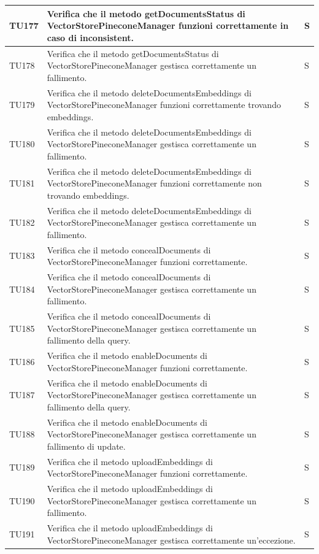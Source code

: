 \documentclass[10pt, a4paper]{article}
\begin{document}
\begin{xltabular}{\textwidth}{p{0.12\textwidth}|p{0.7\textwidth}|X}
\hline
TU177 & Verifica che il metodo getDocumentsStatus di VectorStorePineconeManager funzioni correttamente in caso di inconsistent. & S \\
\hline
TU178 & Verifica che il metodo getDocumentsStatus di VectorStorePineconeManager gestisca correttamente un fallimento. & S \\
\hline
TU179 & Verifica che il metodo deleteDocumentsEmbeddings di VectorStorePineconeManager funzioni correttamente trovando embeddings. & S \\
\hline
TU180 & Verifica che il metodo deleteDocumentsEmbeddings di VectorStorePineconeManager gestisca correttamente un fallimento. & S \\
\hline
TU181 & Verifica che il metodo deleteDocumentsEmbeddings di VectorStorePineconeManager funzioni correttamente non trovando embeddings. & S \\
\hline
TU182 & Verifica che il metodo deleteDocumentsEmbeddings di VectorStorePineconeManager gestisca correttamente un fallimento. & S \\
\hline
TU183 & Verifica che il metodo concealDocuments di VectorStorePineconeManager funzioni correttamente. & S \\
\hline
TU184 & Verifica che il metodo concealDocuments di VectorStorePineconeManager gestisca correttamente un fallimento. & S \\
\hline
TU185 & Verifica che il metodo concealDocuments di VectorStorePineconeManager gestisca correttamente un fallimento della query. & S \\
\hline
TU186 & Verifica che il metodo enableDocuments di VectorStorePineconeManager funzioni correttamente. & S \\
\hline
TU187 & Verifica che il metodo enableDocuments di VectorStorePineconeManager gestisca correttamente un fallimento della query. & S \\
\hline
TU188 & Verifica che il metodo enableDocuments di VectorStorePineconeManager gestisca correttamente un fallimento di update. & S \\
\hline
TU189 & Verifica che il metodo uploadEmbeddings di VectorStorePineconeManager funzioni correttamente. & S \\
\hline
TU190 & Verifica che il metodo uploadEmbeddings di VectorStorePineconeManager gestisca correttamente un fallimento. & S \\
\hline
TU191 & Verifica che il metodo uploadEmbeddings di VectorStorePineconeManager gestisca correttamente un'eccezione. & S \\

\end{xltabular}
\end{document}
